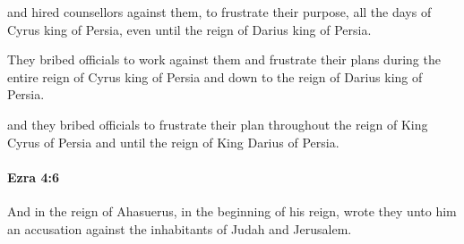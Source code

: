 			\begin{versebox}
					\item[BHS] 
					\item[LXX] 
					\item[ASV] and hired counsellors against them, to frustrate their purpose, all the days of Cyrus king of Persia, even until the reign of Darius king of Persia.
					\item[NIV] They bribed officials to work against them and frustrate their plans during the entire reign of Cyrus king of Persia and down to the reign of Darius king of Persia.
					\item[NRSV] and they bribed officials to frustrate their plan throughout the reign of King Cyrus of Persia and until the reign of King Darius of Persia.
			\end{versebox}

		\paragraph{Ezra 4:6} %
			\label{EZRA-4-6}

			And in the reign of Ahasuerus, in the beginning of his reign, wrote they unto him an accusation against the inhabitants of Judah and Jerusalem.

